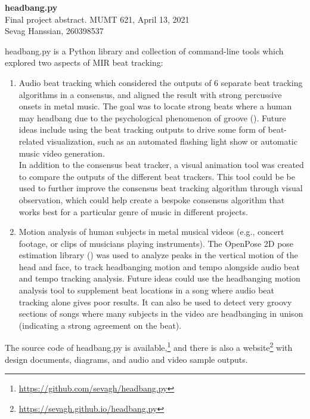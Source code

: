 \documentclass[letter,12pt]{report}
\begin{document}
\noindent\Large{\textbf{headbang.py}}\\
\large{Final project abstract. MUMT 621, April 13, 2021}\\
\large{Sevag Hanssian, 260398537}

\noindent\hrulefill

\vspace{2em}

headbang.py is a Python library and collection of command-line tools which explored two aspects of MIR beat tracking:

\begin{enumerate}
	\item
		Audio beat tracking which considered the outputs of 6 separate beat tracking algorithms in a consensus, and aligned the result with strong percussive onsets in metal music. The goal was to locate strong beats where a human may headbang due to the psychological phenomenon of groove (\cite{groove}). Future ideas include using the beat tracking outputs to drive some form of beat-related visualization, such as an automated flashing light show or automatic music video generation.\\

		\vspace{-0.75em}
		In addition to the consensus beat tracker, a visual animation tool was created to compare the outputs of the different beat trackers. This tool could be be used to further improve the consensus beat tracking algorithm through visual observation, which could help create a bespoke consensus algorithm that works best for a particular genre of music in different projects.
	\item
		Motion analysis of human subjects in metal musical videos (e.g., concert footage, or clips of musicians playing instruments). The OpenPose 2D pose estimation library (\cite{openpose}) was used to analyze peaks in the vertical motion of the head and face, to track headbanging motion and tempo alongside audio beat and tempo tracking analysis. Future ideas could use the headbanging motion analysis tool to supplement beat locations in a song where audio beat tracking alone gives poor results. It can also be used to detect very groovy sections of songs where many subjects in the video are headbanging in unison (indicating a strong agreement on the beat).
\end{enumerate}

The source code of headbang.py is available,\footnote{\url{https://github.com/sevagh/headbang.py}} and there is also a website\footnote{\url{https://sevagh.github.io/headbang.py}} with design documents, diagrams, and audio and video sample outputs.

\vfill
\clearpage

\nocite{*}
\printbibheading[title={\vspace{-3.5em}References},heading=bibnumbered]
\vspace{-1.5em}
\printbibliography[heading=none]
\end{document}
